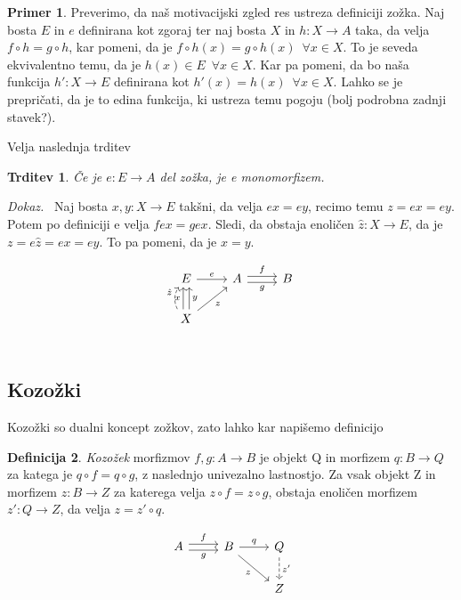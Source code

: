 \documentclass[12pt,a4paper]{book}
\theoremstyle{definition}
\newtheorem{definicija}{Definicija}[chapter]
\theoremstyle{plain}
\newtheorem{trditev}[definicija]{Trditev}
\newenvironment{dokaz}{\emph{Dokaz.}\ }{\hspace{\fill}{$\Box$}}
\theoremstyle{definition}
\newtheorem{primer}{Primer}[section]
\theoremstyle{remark}
\begin{document}
\begin{primer}
Preverimo, da naš motivacijski zgled res ustreza definiciji zožka. Naj bosta $E$ in $e$ definirana kot zgoraj ter naj bosta $X$ in $h:X \to A$ taka, da velja $f \circ h = g \circ h$, kar pomeni, da je $f \circ h(x) = g \circ  h(x) \enspace \forall x \in X$. To je seveda ekvivalentno temu, da je $h(x) \in E \enspace \forall x \in X$. Kar pa pomeni, da bo naša funkcija $h' : X \to E$ definirana kot $h'(x) = h(x) \enspace \forall x \in X$. Lahko se je prepričati, da je to edina funkcija, ki ustreza temu pogoju (bolj podrobna zadnji stavek?).
\end{primer}

Velja naslednja trditev

\begin{trditev}
Če je $e : E \to A$ del zožka, je e monomorfizem.
\end{trditev}
\begin{dokaz}
Naj bosta $x,y : X \to E$ takšni, da velja $ex = ey$, recimo temu $z = ex = ey$. Potem po definiciji e velja $fex = gex$. Sledi, da obstaja enoličen $\hat{z} : X \to E$, da je $z = e\hat{z} = ex = ey$. To pa pomeni, da je $x = y$.

$$\begin{tikzcd}
E \ar[r, "e"] & A \ar[r, shift left, "f"] \ar[r, shift right, "g"'] & B \\
X \ar[u, bend left, shift left, dashed, "\hat{z}"] \ar[u, shift left, "x"] \ar[u, shift right, "y"'] \ar[ur, "z"'] \\
\end{tikzcd}$$

\end{dokaz}


\subsection{Kozožki}

Kozožki so dualni koncept zožkov, zato lahko kar napišemo definicijo

\begin{definicija}
\textit{Kozožek} morfizmov $f,g:A \to B$ je objekt Q in morfizem $q: B \to Q$ za katega je $q \circ f = q \circ g$, z naslednjo univezalno lastnostjo. Za vsak objekt Z in morfizem $z : B \to Z$ za katerega velja $z \circ f = z \circ g$, obstaja enoličen morfizem $z' : Q \to Z$, da velja $z = z' \circ q$.

$$\begin{tikzcd}
A \ar[r, shift left, "f"] \ar[r, shift right, "g"'] & B \ar[r, "q"] \ar[dr, "z"'] & Q \ar[d, dashed, "z'"] \\
& & Z \\
\end{tikzcd}$$

\end{definicija}
\end{document}
